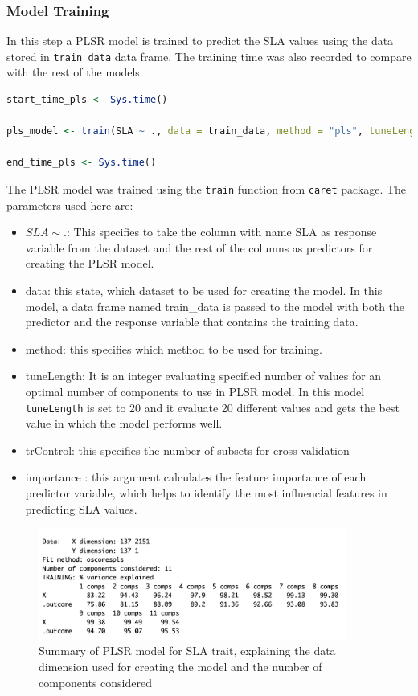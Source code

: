 \documentclass[12pt,a4paper]{report}
\begin{document}
\subsubsection*{Model Training}
In this step a PLSR model is trained to predict the SLA values using the data stored in \texttt{train\_data} data frame. The training time was also recorded to compare with the rest of the models. \\

\begin{lstlisting}[language=R, style=mystyle]
start_time_pls <- Sys.time()

pls_model <- train(SLA ~ ., data = train_data, method = "pls", tuneLength = 20, trControl = train_control, importance = TRUE)

end_time_pls <- Sys.time()
\end{lstlisting}

The PLSR model was trained using the \texttt{train} function from \texttt{caret} package. The parameters used here are:
\begin{itemize}
    \item $SLA \sim .$: This specifies to take the column with name SLA as response variable from the dataset and the rest of the columns as predictors for creating the PLSR model.
    \item data: this state, which dataset to be used for creating the model. In this model, a data frame named train\_data is passed to the model with both the predictor and the response variable that contains the training data.
    \item method: this specifies which method to be used for training.
    \item tuneLength: It is an integer evaluating specified number of values for an optimal number of components to use in PLSR model. In this model \texttt{tuneLength} is set to 20 and it evaluate 20 different values and gets the best value in which the model performs well. 
    \item trControl: this specifies the number of subsets for cross-validation 
    \item importance : this argument calculates the feature importance of each predictor variable, which helps to identify the most influencial features in predicting SLA values.
\end{itemize}

\begin{figure}[h]
    \centering
    \includegraphics[width=0.9\textwidth]{Figures/plsr_model.png}
    \caption{Summary of PLSR model for SLA trait, explaining the data dimension used for creating the model and the number of components considered}
    \label{fig:plsr_model}
\end{figure}
\end{document}
